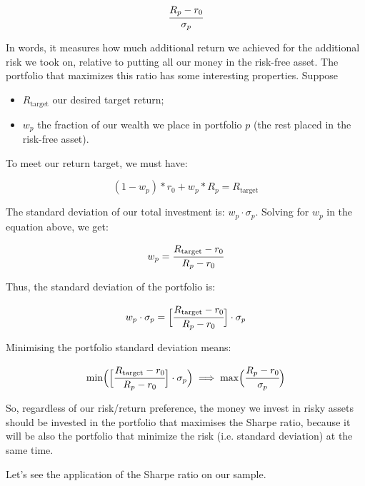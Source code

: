 \[ \cfrac{R_p - r_0}{\sigma_p} \]

In words, it measures how much additional return we achieved for the
additional risk we took on, relative to putting all our money in the
risk-free asset. The portfolio that maximizes this ratio has some interesting properties. Suppose

\begin{itemize}
\tightlist
\item
  \(R_\textrm{target}\) our desired target return;
\item
  \(w_p\) the fraction of our wealth we place in portfolio \(p\) (the
  rest placed in the risk-free asset).
\end{itemize}

To meet our return target, we must have:

\[ (1 - w_p) * r_0 + w_p * R_p =R_\textrm{target} \]

The standard deviation of our total investment is:
\(w_p\cdot \sigma_p\). Solving for \(w_p\) in the equation above, we
get:

\[ w_p = \cfrac{R_\textrm{target} - r_0}{R_p - r_0} \]

Thus, the standard deviation of the portfolio is:

\[ w_p\cdot \sigma_p = \Big[\cfrac{R_\textrm{target} - r_0}{R_p - r_0}\Big]\cdot \sigma_p \]

Minimising the portfolio standard deviation means:

\[ \textrm{min}\Big(\Big[\cfrac{R_\textrm{target} - r_0}{R_p - r_0}\Big]\cdot \sigma_p\Big)\implies\textrm{max}\Big(\cfrac{R_p - r_0}{\sigma_p}\Big) \]

So, regardless of our risk/return preference, the money we invest in
risky assets should be invested in the portfolio that maximises
the Sharpe ratio, because it will be also the portfolio that minimize 
the risk (i.e. standard deviation) at the same time.

Let's see the application of the Sharpe ratio on our sample.

